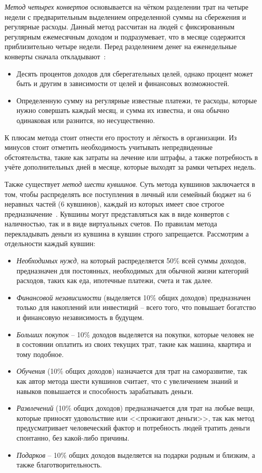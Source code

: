 \emph{Метод четырех конвертов} основывается на чётком разделении трат на четыре недели с предварительным выделением определенной суммы на сбережения и регулярные расходы.
Данный метод рассчитан на людей с фиксированным регулярным ежемесячным доходом и подразумевает, что в месяце содержится приблизительно четыре недели.
Перед разделением денег на еженедельные конверты сначала откладывают~\cite{four_envelope_rule}:
\begin{itemize}
    \item Десять процентов доходов для сберегательных целей, однако процент может быть и другим в зависимости от целей и финансовых возможностей.
    \item Определенную сумму на регулярные известные платежи, те расходы, которые нужно совершать каждый месяц, и сумма их известна, и она обычно одинаковая или разнится, но несущественно.
\end{itemize}

К плюсам метода стоит отнести его простоту и лёгкость в организации.
Из минусов стоит отметить необходимость учитывать непредвиденные обстоятельства, такие как затраты на лечение или штрафы, а также потребность в учёте дополнительных дней в месяце, которые выходят за рамки четырех недель.

Также существует \emph{метод шести кувшинов}.
Суть метода кувшинов заключается в том, чтобы распределять все поступления в личный или семейный бюджет на 6 неравных частей (6 кувшинов), каждый из которых имеет свое строгое предназначение~\cite{six_jugs}.
Кувшины могут представляться как в виде конвертов с наличностью, так и в виде виртуальных счетов.
По правилам метода перекладывать деньги из кувшина в кувшин строго запрещается.
Рассмотрим а отдельности каждый кувшин:
\begin{itemize}
    \item \emph{Необходимых нужд}, на который распределяется 50\% всей суммы доходов, предназначен для постоянных, необходимых для обычной жизни категорий расходов, таких как еда, ипотечные платежи, счета и так далее.
    \item \emph{Финансовой независимости} (выделяется 10\% общих доходов) предназначен только для накоплений или инвестиций -- всего того, что повышает богатство и финансовую независимость в будущем.
    \item \emph{Больших покупок} -- 10\% доходов выделяется на покупки, которые человек не в состоянии оплатить из своих текущих трат, такие как машина, квартира и тому подобное.
    \item \emph{Обучения} (10\% общих доходов) назначается для трат на саморазвитие, так как автор метода шести кувшинов считает, что с увеличением знаний и навыков повышается и способность зарабатывать деньги.
    \item \emph{Развлечений} (10\% общих доходов) предназначается для трат на любые вещи, которые приносят удовольствие или <<прожигают деньги>>, так как метод предусматривает человеческий фактор и потребность людей тратить деньги спонтанно, без какой-либо причины.
    \item \emph{Подарков} -- 10\% общих доходов выделяется на подарки родным и близким, а также благотворительность.
\end{itemize}

